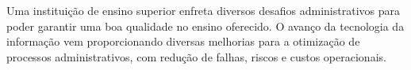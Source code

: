 












Uma instituição de ensino superior enfreta diversos desafios administrativos para poder garantir uma boa qualidade no ensino oferecido. O avanço da tecnologia da informação vem proporcionando diversas melhorias para a otimização de processos administrativos, com redução de falhas, riscos e custos operacionais.


